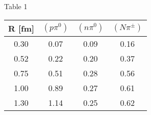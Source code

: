 \newpage

\centerline{\Large Table 1}
\vspace{2cm}
\begin{center}
\begin{tabular}{c||c|c|c}
 R [fm]   & $    (p\pi^0)$  & $ (n\pi^0)$   & $ (N\pi^\pm)$  \\ \hline\hline
 0.30     & 0.07            &    0.09       &   0.16         \\ \hline
 0.52     &   0.22          &    0.20       &   0.37         \\  \hline
 0.75     &   0.51          &    0.28       &   0.56         \\  \hline
 1.00     &   0.89          &    0.27       &   0.61          \\  \hline
 1.30     &   1.14          &    0.25       &   0.62          \\
\end{tabular}
\end{center}
 

